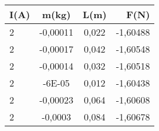 \begin{tabular}{|l|c|c|r|}
\hline
I(A)	&m(kg)	&L(m)	&F(N)\\ \hline
2	&-0,00011	&0,022	&-1,60488\\
2	&-0,00017	&0,042	&-1,60548\\
2	&-0,00014	&0,032	&-1,60518\\
2	&-6E-05	&0,012	&-1,60438\\
2	&-0,00023	&0,064	&-1,60608\\
2	&-0,0003	&0,084	&-1,60678\\ \hline
\end{tabular}
